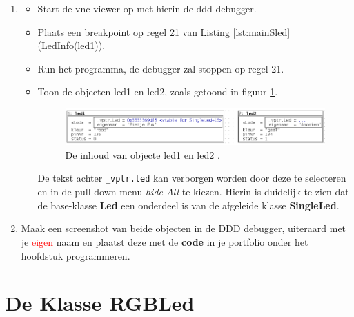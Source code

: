 \begin{enumerate}[label=(\alph*)]
De uitkomst van het programma wordt weergegeven op de volgende bladzijde.
\newpage
De eigenaar is:Pietje Puk\\
De Led is aangesloten op pinnen135\\
De status van de Led is:0\\
De eigenaar is:Anoniem\\
De Led is aangesloten op pinnen134\\
De status van de Led is:1\\
De eigenaar is:Pietje Puk\\
De Led is aangesloten op pinnen135\\
De status van de Led is:0\\
\item 
\begin{itemize}
	\item Start de vnc viewer op met hierin de ddd debugger.
	\item Plaats een breakpoint op regel 21 van Listing \ref{lst:mainSled} (LedInfo(led1)).
	\item Run het programma, de debugger zal stoppen op regel 21.
	\item Toon de objecten led1 en led2, zoals getoond in figuur \ref{fig:dddLed1_2}. 
	\begin{figure}[h!]
		\captionsetup{justification=centering}
    	\includegraphics[width=0.95 \textwidth]{figuren/dddLed1Led2}
		\centering
		\caption{De inhoud van objecte led1 en led2 .}
		\label{fig:dddLed1_2}
	\end{figure}
	De tekst achter \texttt{\_vptr.led} kan verborgen worden door deze te selecteren en in de pull-down menu \textit{hide All} te kiezen. Hierin is duidelijk te zien dat de base-klasse  \textbf{Led} een onderdeel is van de afgeleide klasse \textbf{SingleLed}.
\end{itemize}

\item Maak een screenshot van beide objecten in de DDD debugger, uiteraard met je \textcolor{red}{\huge{eigen}} naam en plaatst deze met de \textbf{code} in je portfolio onder het hoofdstuk programmeren.

\end{enumerate}

\section{De Klasse RGBLed}

